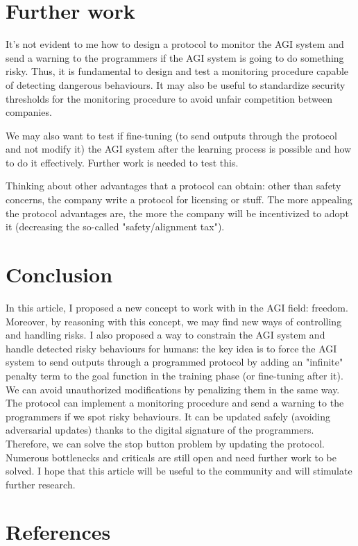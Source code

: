 \documentclass{article}
\begin{document}
\section{Further work}
It's not evident to me how to design a protocol to monitor the AGI system and send a warning to the programmers if the AGI system is going to do something risky. Thus, it is fundamental to design and test a monitoring procedure capable of detecting dangerous behaviours.
It may also be useful to standardize security thresholds for the monitoring procedure to avoid unfair competition between companies.

We may also want to test if fine-tuning (to send outputs through the protocol and not modify it) the AGI system after the learning process is possible and how to do it effectively. Further work is needed to test this.

Thinking about other advantages that a protocol can obtain: other than safety concerns, the company write a protocol for licensing or stuff. 
The more appealing the protocol advantages are, the more the company will be incentivized to adopt it (decreasing the so-called "safety/alignment tax").

\section{Conclusion}
In this article, I proposed a new concept to work with in the AGI field: freedom. Moreover, by reasoning with this concept, we may find new ways of controlling and handling risks.
I also proposed a way to constrain the AGI system and handle detected risky behaviours for humans: the key idea is to force the AGI system to send outputs through a programmed protocol by adding an "infinite" penalty term to the goal function in the training phase (or fine-tuning after it). 
We can avoid unauthorized modifications by penalizing them in the same way.
The protocol can implement a monitoring procedure and send a warning to the programmers if we spot risky behaviours.
It can be updated safely (avoiding adversarial updates) thanks to the digital signature of the programmers. 
Therefore, we can solve the stop button problem by updating the protocol.
Numerous bottlenecks and criticals are still open and need further work to be solved.
I hope that this article will be useful to the community and will stimulate further research.

\newpage
\section*{References}
    \printbibliography[heading=none]
\end{document}
